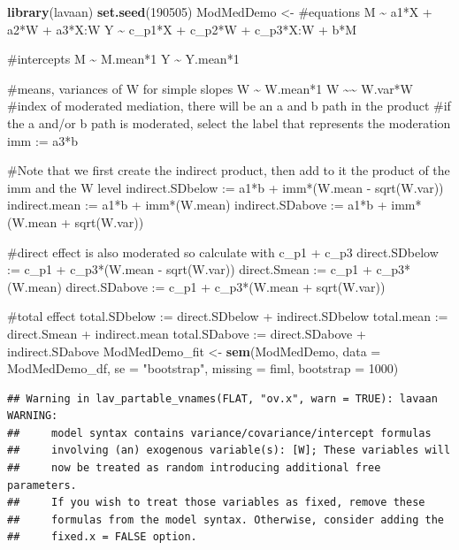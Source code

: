 \documentclass[
  11pt,
]{book}
\newenvironment{Shaded}{\begin{snugshade}}{\end{snugshade}}
\newcommand{\AttributeTok}[1]{\textcolor[rgb]{0.27,0.27,0.27}{#1}}
\newcommand{\DecValTok}[1]{\textcolor[rgb]{0.06,0.06,0.06}{#1}}
\newcommand{\FunctionTok}[1]{\textcolor[rgb]{0.27,0.27,0.27}{\textbf{#1}}}
\newcommand{\NormalTok}[1]{#1}
\newcommand{\OtherTok}[1]{\textcolor[rgb]{0.37,0.37,0.37}{#1}}
\newcommand{\StringTok}[1]{\textcolor[rgb]{0.5,0.5,0.5}{#1}}
\begin{document}
\begin{Shaded}
\begin{Highlighting}[]
\FunctionTok{library}\NormalTok{(lavaan)}
\FunctionTok{set.seed}\NormalTok{(}\DecValTok{190505}\NormalTok{)}
\NormalTok{ModMedDemo }\OtherTok{\textless{}{-}} \StringTok{\textquotesingle{}}
\StringTok{    \#equations}
\StringTok{    M \textasciitilde{} a1*X + a2*W + a3*X:W}
\StringTok{    Y \textasciitilde{} c\_p1*X + c\_p2*W + c\_p3*X:W + b*M}

\StringTok{    \#intercepts}
\StringTok{    M \textasciitilde{} M.mean*1}
\StringTok{    Y \textasciitilde{} Y.mean*1}

\StringTok{    \#means, variances of W for simple slopes}
\StringTok{    W \textasciitilde{} W.mean*1}
\StringTok{    W \textasciitilde{}\textasciitilde{} W.var*W}
\StringTok{    }
\StringTok{    \#index of moderated mediation, there will be an a and b path in the product}
\StringTok{    \#if the a and/or b path is moderated, select the label that represents the moderation}
\StringTok{    imm := a3*b}

\StringTok{    \#Note that we first create the indirect product, then add to it the product of the imm and the W level}
\StringTok{    indirect.SDbelow := a1*b + imm*(W.mean {-} sqrt(W.var))}
\StringTok{    indirect.mean := a1*b + imm*(W.mean)}
\StringTok{    indirect.SDabove := a1*b + imm*(W.mean + sqrt(W.var))}

\StringTok{    \#direct effect is also moderated so calculate with c\_p1 + c\_p3}
\StringTok{    direct.SDbelow := c\_p1 + c\_p3*(W.mean {-} sqrt(W.var)) }
\StringTok{    direct.Smean := c\_p1 + c\_p3*(W.mean)}
\StringTok{    direct.SDabove := c\_p1 + c\_p3*(W.mean + sqrt(W.var))}

\StringTok{    \#total effect}
\StringTok{    total.SDbelow := direct.SDbelow + indirect.SDbelow}
\StringTok{    total.mean := direct.Smean + indirect.mean}
\StringTok{    total.SDabove := direct.SDabove + indirect.SDabove}
\StringTok{ \textquotesingle{}}
\NormalTok{ModMedDemo\_fit }\OtherTok{\textless{}{-}} \FunctionTok{sem}\NormalTok{(ModMedDemo, }\AttributeTok{data =}\NormalTok{ ModMedDemo\_df, }\AttributeTok{se =} \StringTok{"bootstrap"}\NormalTok{, }\AttributeTok{missing =} \StringTok{\textquotesingle{}fiml\textquotesingle{}}\NormalTok{, }\AttributeTok{bootstrap =} \DecValTok{1000}\NormalTok{)}
\end{Highlighting}
\end{Shaded}

\begin{verbatim}
## Warning in lav_partable_vnames(FLAT, "ov.x", warn = TRUE): lavaan WARNING:
##     model syntax contains variance/covariance/intercept formulas
##     involving (an) exogenous variable(s): [W]; These variables will
##     now be treated as random introducing additional free parameters.
##     If you wish to treat those variables as fixed, remove these
##     formulas from the model syntax. Otherwise, consider adding the
##     fixed.x = FALSE option.
\end{verbatim}
\end{document}
